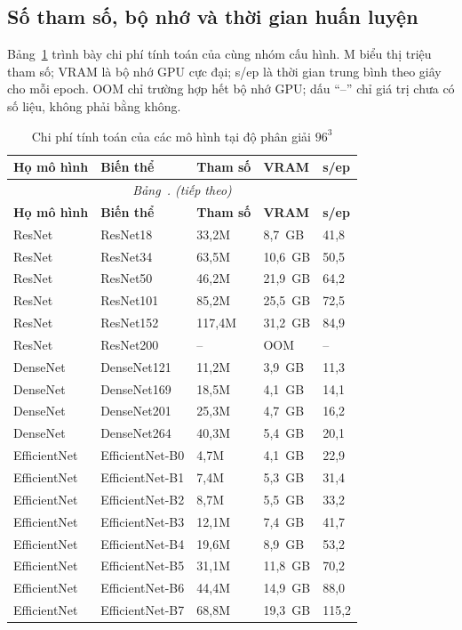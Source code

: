 \documentclass[14pt,a4paper,oneside]{extreport}
\renewcommand{\thetable}{\thechapter.\arabic{table}}
\begin{document}
\clearpage
\subsection{Số tham số, bộ nhớ và thời gian huấn luyện}
Bảng~\ref{tab:sweep-resource} trình bày chi phí tính toán của cùng nhóm cấu hình.
M biểu thị triệu tham số; VRAM là bộ nhớ GPU cực đại; s/ep là thời
gian trung bình theo giây cho mỗi epoch. OOM chỉ trường hợp hết bộ
nhớ GPU; dấu ``--'' chỉ giá trị chưa có số liệu, không phải bằng không.

\begin{longtable}{@{}p{}p{}p{}p{}p{}@{}}
  \caption{Chi phí tính toán của các mô hình tại độ phân giải $96^3$}
  \label{tab:sweep-resource}\\
  \toprule
  \textbf{Họ mô hình} & \textbf{Biến thể} & \textbf{Tham số} & \textbf{VRAM} & \textbf{s/ep}\\
  \midrule
  \endfirsthead
  \multicolumn{5}{c}{\textit{Bảng~\thetable{} (tiếp theo)}}\\
  \toprule
  \textbf{Họ mô hình} & \textbf{Biến thể} & \textbf{Tham số} & \textbf{VRAM} & \textbf{s/ep}\\
  \midrule
  \endhead
  \bottomrule
  \endfoot
  ResNet & ResNet18 & 33,2M & 8,7~GB & 41,8\\
  ResNet & ResNet34 & 63,5M & 10,6~GB & 50,5\\
  ResNet & ResNet50 & 46,2M & 21,9~GB & 64,2\\
  ResNet & ResNet101 & 85,2M & 25,5~GB & 72,5\\
  ResNet & ResNet152 & 117,4M & 31,2~GB & 84,9\\
  ResNet & ResNet200 & -- & OOM & --\\
  \midrule
  DenseNet & DenseNet121 & 11,2M & 3,9~GB & 11,3\\
  DenseNet & DenseNet169 & 18,5M & 4,1~GB & 14,1\\
  DenseNet & DenseNet201 & 25,3M & 4,7~GB & 16,2\\
  DenseNet & DenseNet264 & 40,3M & 5,4~GB & 20,1\\
  \midrule
  EfficientNet & EfficientNet-B0 & 4,7M & 4,1~GB & 22,9\\
  EfficientNet & EfficientNet-B1 & 7,4M & 5,3~GB & 31,4\\
  EfficientNet & EfficientNet-B2 & 8,7M & 5,5~GB & 33,2\\
  EfficientNet & EfficientNet-B3 & 12,1M & 7,4~GB & 41,7\\
  EfficientNet & EfficientNet-B4 & 19,6M & 8,9~GB & 53,2\\
  EfficientNet & EfficientNet-B5 & 31,1M & 11,8~GB & 70,2\\
  EfficientNet & EfficientNet-B6 & 44,4M & 14,9~GB & 88,0\\
  EfficientNet & EfficientNet-B7 & 68,8M & 19,3~GB & 115,2\\
\end{longtable}
\end{document}
